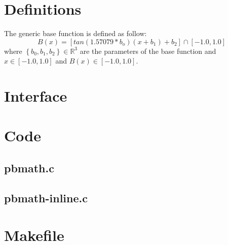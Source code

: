 \section{Definitions}

The generic base function is defined as follow:\\
\begin{equation}
B(x)=\left[tan(1.57079*b_o)(x+b_1)+b_2\right]\cap[-1.0,1.0]
\end{equation}
where $\left\lbrace b_0,b_1,b_2\right\rbrace\in\mathbb{R}^3$ are the parameters of the base function and $x\in[-1.0,1.0]$ and $B(x)\in[-1.0,1.0]$.

\section{Interface}

\begin{scriptsize}
\begin{ttfamily}

\end{ttfamily}
\end{scriptsize}

\section{Code}

\subsection{pbmath.c}

\begin{scriptsize}
\begin{ttfamily}

\end{ttfamily}
\end{scriptsize}

\subsection{pbmath-inline.c}

\begin{scriptsize}
\begin{ttfamily}

\end{ttfamily}
\end{scriptsize}

\section{Makefile}

